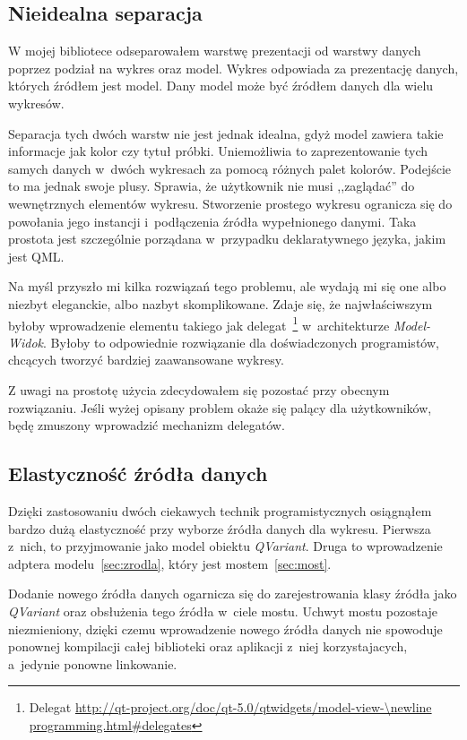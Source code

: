 \subsection{Nieidealna separacja}
W mojej bibliotece odseparowałem warstwę prezentacji od warstwy danych poprzez podział na wykres oraz model. Wykres odpowiada za prezentację danych, których źródłem jest model. Dany model może być źródłem danych dla wielu wykresów.

Separacja tych dwóch warstw nie jest jednak idealna, gdyż model zawiera takie informacje jak kolor czy tytuł próbki. Uniemożliwia to zaprezentowanie tych samych danych w~dwóch wykresach za pomocą różnych palet kolorów. Podejście to ma jednak swoje plusy. Sprawia, że użytkownik nie musi ,,zaglądać'' do wewnętrznych elementów wykresu. Stworzenie prostego wykresu ogranicza się do powołania jego instancji i~podłączenia źródła wypełnionego danymi. Taka prostota jest szczególnie porządana w~przypadku deklaratywnego języka, jakim jest QML.

Na myśl przyszło mi kilka rozwiązań tego problemu, ale wydają mi się one albo niezbyt eleganckie, albo nazbyt skomplikowane. Zdaje się, że najwłaściwszym byłoby wprowadzenie elementu takiego jak delegat~\footnote{Delegat \url{http://qt-project.org/doc/qt-5.0/qtwidgets/model-view-\newline programming.html\#delegates}} w~architekturze \textit{Model-Widok}. Byłoby to odpowiednie rozwiązanie dla doświadczonych programistów, chcących tworzyć bardziej zaawansowane wykresy.

Z uwagi na prostotę użycia zdecydowałem się pozostać przy obecnym rozwiązaniu. Jeśli wyżej opisany problem okaże się palący dla użytkowników, będę zmuszony wprowadzić mechanizm delegatów.

\subsection{Elastyczność źródła danych}\label{sub:flexible}
Dzięki zastosowaniu dwóch ciekawych technik programistycznych osiągnąłem bardzo dużą elastyczność przy wyborze źródła danych dla wykresu. Pierwsza z~nich, to przyjmowanie jako model obiektu \textit{QVariant}. Druga to wprowadzenie adptera modelu~\ref{sec:zrodla}, który jest mostem~\ref{sec:most}.

Dodanie nowego źródła danych ogarnicza się do zarejestrowania klasy źródła jako \textit{QVariant} oraz obsłużenia tego źródła w~ciele mostu. Uchwyt mostu pozostaje niezmieniony, dzięki czemu wprowadzenie nowego źródła danych nie spowoduje ponownej kompilacji całej biblioteki oraz aplikacji z~niej korzystajacych, a~jedynie ponowne linkowanie.

